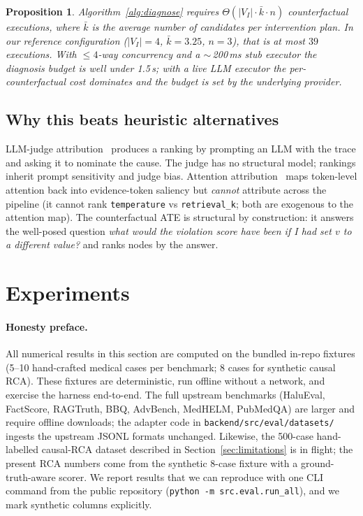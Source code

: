 \documentclass[11pt,letterpaper]{article}
\newtheorem{proposition}{Proposition}
\begin{document}
\begin{proposition}
Algorithm~\ref{alg:diagnose} requires
$\Theta(|V_I| \cdot \bar{k} \cdot n)$ counterfactual executions,
where $\bar{k}$ is the average number of candidates per intervention
plan.  In our reference configuration ($|V_I| = 4$, $\bar{k} = 3.25$,
$n = 3$), that is at most $39$ executions.  With $\le 4$-way
concurrency and a $\sim$\,200\,ms stub executor the diagnosis budget
is well under 1.5\,s; with a live LLM executor the per-counterfactual
cost dominates and the budget is set by the underlying provider.
\end{proposition}

\subsection{Why this beats heuristic alternatives}
\label{sec:why}

LLM-judge attribution~\cite{zheng2023llmjudge} produces a ranking by
prompting an LLM with the trace and asking it to nominate the cause.
The judge has no structural model; rankings inherit prompt sensitivity
and judge bias.  Attention attribution~\cite{simonyan2014saliency,abnar2020attention}
maps token-level attention back into evidence-token saliency but
\emph{cannot} attribute across the pipeline (it cannot rank
\texttt{temperature} vs \texttt{retrieval\_k}; both are exogenous to
the attention map).  The counterfactual ATE is structural by
construction: it answers the well-posed question \emph{what would the
violation score have been if I had set $v$ to a different value?} and
ranks nodes by the answer.

\section{Experiments}
\label{sec:experiments}

\paragraph{Honesty preface.} All numerical results in this section are
computed on the bundled in-repo fixtures (5--10 hand-crafted medical
cases per benchmark; 8 cases for synthetic causal RCA).  These
fixtures are deterministic, run offline without a network, and
exercise the harness end-to-end.  The full upstream benchmarks
(HaluEval, FactScore, RAGTruth, BBQ, AdvBench, MedHELM, PubMedQA) are
larger and require offline downloads; the adapter code in
\texttt{backend/src/eval/datasets/} ingests the upstream JSONL formats
unchanged.  Likewise, the 500-case hand-labelled causal-RCA dataset
described in Section~\ref{sec:limitations} is in flight; the present
RCA numbers come from the synthetic 8-case fixture with a
ground-truth-aware scorer.  We report results that we can reproduce
with one CLI command from the public repository
(\texttt{python -m src.eval.run\_all}), and we mark synthetic columns
explicitly.
\end{document}

